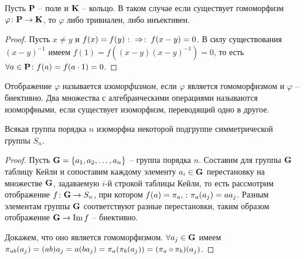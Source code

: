 \begin{theorem}
  Пусть $\mathbf{P}$ -- поле и $\mathbf{K}$ -- кольцо. В таком случае если существует гомоморфизм $\varphi\colon\mathbf{P}\to\mathbf{K}$, то $\varphi$ либо тривиален, либо инъективен.
\end{theorem}
\begin{proof}
  Пусть $x\ne y$ и $f(x)=f(y)\mathbin{\colon\Rightarrow \colon} f(x-y)=0$. В силу существования $(x-y)^{-1}$ имеем $f(1)=f\left((x-y)(x-y)^{-1}\right)=0$, то есть $\forall a\in\mathbf{P}\colon f(a)=f(a\cdot 1)=0$.
\end{proof}

\begin{df}
  Отображение $\varphi$ называется \emph{изоморфизмом}, если $\varphi$ является гомоморфизмом и $\varphi$ -- биективно. Два множества с алгебраическими операциями называются изоморфными, если существует изоморфизм, переводящий одно в другое.
\end{df}

\begin{theorem}[Кейли]
  Всякая группа порядка $n$ изоморфна некоторой подгруппе симметрической группы $S_n$.
\end{theorem}
\begin{proof}
  Пусть $\mathbf{G}=\{a_1,a_2,\dots,a_n\}$ -- группа порядка $n$. Составим для группы $\mathbf{G}$ таблицу Кейли и сопоставим каждому элементу $a_i\in\mathbf{G}$ перестановку на множестве $\mathbf{G}$, задаваемую $i$-й строкой таблицы Кейли, то есть рассмотрим отображение $f\colon \mathbf{G}\to S_n$, при котором $f(a)=\pi_a,\colon \pi_a(a_j)=aa_j$. Разным элементам группы $\mathbf{G}$ соответствуют разные перестановки, таким образом отображение $\mathbf{G}\to \mathop{\mathrm{Im}}\nolimits f$ -- биективно.
  
  Докажем, что оно является гомоморфизмом. $\forall a_j\in\mathbf{G}$ имеем $\pi_{ab}(a_j)\bw=(ab)a_j\bw=a(ba_j)\bw=\pi_a(\pi_b(a_j))\bw=(\pi_a\circ\pi_b)(a_j)$.
\end{proof}


